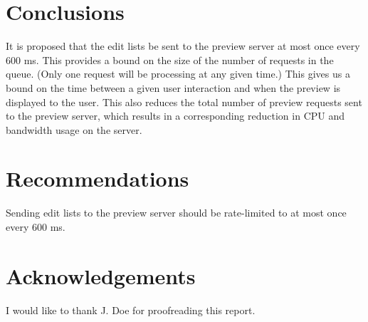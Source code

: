 \documentclass[se,resubmit]{uw-wkrpt}
\begin{document}
\section{Conclusions}
It is proposed that the edit lists be sent to the preview server at most once
every 600 ms. This provides a bound on the size of the number of requests in the
queue. (Only one request will be processing at any given time.) This gives us a
bound on the time between a given user interaction and when the preview is
displayed to the user. This also reduces the total number of preview requests
sent to the preview server, which results in a corresponding reduction in CPU
and bandwidth usage on the server.

\section{Recommendations}
Sending edit lists to the preview server should be rate-limited to at most once
every 600 ms.

\backmatter

%
\printbibliography[heading=bibintoc]

\section{Acknowledgements}
I would like to thank J. Doe for proofreading this report.
\end{document}
